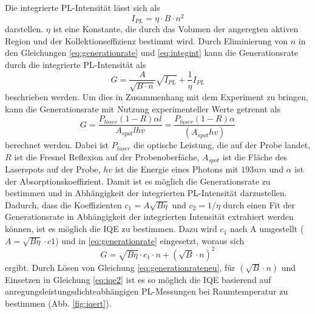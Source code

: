 Die integrierte PL-Intensität lässt sich als 
\begin{equation}
    I_{PL} = \eta \cdot B \cdot n^2
    \label{eq:integint}
\end{equation} 
darstellen. $\eta$ ist eine Konstante, die durch das Volumen der angeregten aktiven Region und der Kollektionseffizienz bestimmt wird. Durch Eliminierung von $n$ in den Gleichungen \ref{eq:generationrate} und \ref{eq:integint} kann die Generationsrate durch die integrierte PL-Intensität als
\begin{equation}
    G = \frac{A}{\sqrt{B\cdot n}}\sqrt{I_{PL}} + \frac{1}{\eta} I_{PL}
\end{equation} 
beschrieben werden. Um dies in Zusammenhang mit dem Experiment zu bringen, kann die Generationsrate mit Nutzung experimenteller Werte getrennt als
\begin{equation}
    G = \frac{P_{laser} (1-R)\alpha l}{A_{spot} l h v} = \frac{P_{laser}(1-R) \alpha }{ (A_{spot} h v)}
\end{equation} berechnet werden.
Dabei ist $P_{laser}$ die optische Leistung, die auf der Probe landet, $R$ ist die Fresnel Reflexion auf der Probenoberfäche, $A_{spot}$ ist die Fläche des Laserspots auf der Probe, $h v$ ist die Energie eines Photons mit $193 nm$ und $\alpha$ ist der Absorptionskoeffizient. Damit ist es möglich die Generationsrate zu bestimmen und in Abhängigkeit der integrierten PL-Intensität darzustellen. Dadurch, dass die Koeffizienten $c_1 = A \sqrt{B  \eta}$ und $c_2 = 1 / \eta$ durch einen Fit der Generationsrate in Abhängigkeit der integrierten Intensität extrahiert werden können, ist es möglich die IQE zu bestimmen. Dazu wird $c_1$ nach A umgestellt ($A = \sqrt{B \eta} \cdot c1$) und in \ref{eq:generationrate} eingesetzt, woraus sich 
\begin{equation}
    G = \sqrt{B \eta} \cdot c_1\cdot n + (\sqrt{B} \cdot n)^2
    \label{eq:generationrateneu}
\end{equation}  
ergibt. 
Durch Lösen von Gleichung \ref{eq:generationrateneu}, für $(\sqrt{B} \cdot n)$ und Einsetzen in Gleichung \ref{eq:iqe2} ist es so möglich die IQE basierend auf anregungsleistungsdichteabhängigen PL-Messungen bei Raumtemperatur zu bestimmen (Abb. \ref{fig:iqert}).


